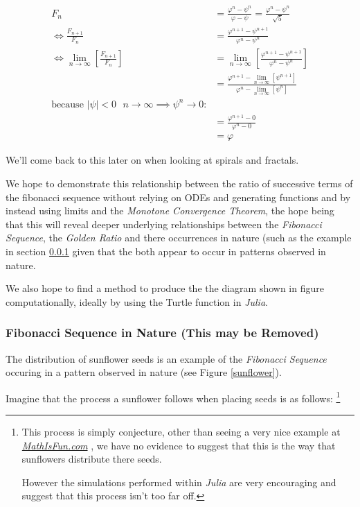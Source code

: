 \documentclass[11pt]{article}
\begin{document}
\begin{align*}
    F_n &= \frac{\varphi^n-\psi^n}{\varphi-\psi} = \frac{\varphi^n-\psi^n}{\sqrt 5} \\
    \iff \frac{F_{n+1}}{F_n}	&= \frac{\varphi^{n+ 1} - \psi^{n+  1}}{\varphi^{n} - \psi^{n}} \\
    \iff \lim_{n \rightarrow \infty}\left[ \frac{F_{n+1}}{F_n} \right]	&= \lim_{n \rightarrow \infty}\left[ \frac{\varphi^{n+ 1} - \psi^{n+  1}}{\varphi^{n} - \psi^{n}} \right] \\
&= \frac{\varphi^{n+ 1} -\lim_{n \rightarrow \infty}\left[ \psi^{n +  1} \right] }{\varphi^{n} - \lim_{n \rightarrow \infty}\left[ \psi^n \right] } \\
\text{because $\mid \psi \mid < 0$ $n \rightarrow \infty \implies \psi^{n} \rightarrow 0$:} \\
&= \frac{\varphi^{n+  1} -  0}{\varphi^{n} -  0} \\
&= \varphi
\end{align*}

We'll come back to this later on when looking at spirals and fractals.

We hope to demonstrate this relationship between the ratio of successive terms
of the fibonacci sequence without relying on ODEs and generating functions and
by instead using limits and the \emph{Monotone Convergence Theorem}, the hope being
that this will reveal deeper underlying relationships between the \emph{Fibonacci
Sequence}, the \emph{Golden Ratio} and there occurrences in nature (such as the
example in section \ref{sunflower-example} given that the both appear to occur in
patterns observed in nature.

We also hope to find a method to produce the the diagram shown in figure
computationally, ideally by using the Turtle function in \emph{Julia}.

\subsubsection{Fibonacci Sequence in Nature (This may be Removed)}
\label{sunflower-example}
The distribution of sunflower seeds is an example of the \emph{Fibonacci Sequence}
occuring in a pattern observed in nature (see Figure \ref{sunflower}).

Imagine that the process a sunflower follows when placing seeds is as follows: \footnote{This process is simply conjecture, other than seeing a very nice example at \href{https://www.mathsisfun.com/numbers/nature-golden-ratio-fibonacci.html}{\emph{MathIsFun.com}}
\cite{NatureGoldenRatio2018}, we have no evidence to suggest that this is the way
that sunflowers distribute there seeds.

However the simulations performed within \emph{Julia} are very encouraging and
suggest that this process isn't too far off.}
\end{document}
